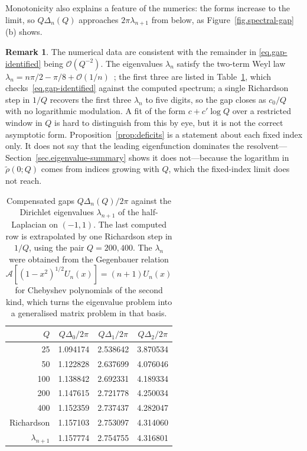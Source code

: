\documentclass[11pt,a4paper]{article}
\theoremstyle{definition}
\newtheorem{remark}[theorem]{Remark}
\begin{document}
Monotonicity also explains a feature of the numerics: the forms increase to the
limit, so $Q\Delta_n(Q)$ approaches $2\pi\lambda_{n+1}$ from below, as
Figure~\ref{fig.spectral-gap}(b) shows.

\begin{remark}\label{rem:gap-numerics}
The numerical data are consistent with the remainder in
\eqref{eq.gap-identified} being $\mathcal O(Q^{-2})$.
The eigenvalues $\lambda_n$ satisfy the two-term Weyl law
$\lambda_n = n\pi/2 - \pi/8 + \mathcal O(1/n)$~\cite{Kwasnicki2012}; the first
three are listed in Table~\ref{tab:gap-extrapolation}, which checks~\eqref{eq.gap-identified} against the
computed spectrum; a single Richardson step in $1/Q$ recovers the first three
$\lambda_n$ to five digits, so the gap closes as $c_0/Q$ with no logarithmic
modulation.  A fit of the form
$c + c'\log Q$ over a restricted window in $Q$ is hard to distinguish from this
by eye, but it is not the correct asymptotic form.
Proposition~\ref{prop:deficits} is a statement about each fixed index only.  It
does not say that the leading eigenfunction dominates the
resolvent---Section~\ref{sec.eigenvalue-summary} shows it does not---because the
logarithm in $\tilde\rho(0;Q)$ comes from indices growing with $Q$, which the
fixed-index limit does not reach.
\end{remark}

\begin{table}[htbp]
\centering
\begin{tabular}{r c c c}
\hline\hline
$Q$ & $Q\Delta_0/2\pi$ & $Q\Delta_1/2\pi$ & $Q\Delta_2/2\pi$ \\
\hline
25   & 1.094174 & 2.538642 & 3.870534 \\
50   & 1.122828 & 2.637699 & 4.076046 \\
100  & 1.138842 & 2.692331 & 4.189334 \\
200  & 1.147615 & 2.721778 & 4.250034 \\
400  & 1.152359 & 2.737437 & 4.282047 \\
\hline
Richardson & 1.157103 & 2.753097 & 4.314060 \\
$\lambda_{n+1}$ & 1.157774 & 2.754755 & 4.316801 \\
\hline\hline
\end{tabular}
\caption{Compensated gaps $Q\Delta_n(Q)/2\pi$ against the Dirichlet eigenvalues
$\lambda_{n+1}$ of the half-Laplacian on $(-1,1)$.  The last computed row is
extrapolated by one Richardson step in $1/Q$, using the pair $Q = 200, 400$.
The $\lambda_n$ were obtained from the Gegenbauer relation
$\mathcal{A}\left[(1-x^2)^{1/2}U_n(x)\right] = (n+1)U_n(x)$ for Chebyshev
polynomials of the second kind, which turns the eigenvalue problem into a
generalised matrix problem in that basis.}
\label{tab:gap-extrapolation}
\end{table}
\end{document}
